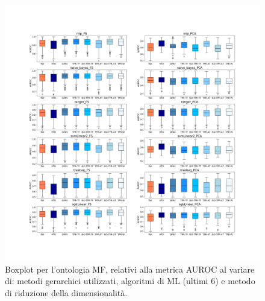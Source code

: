 \documentclass[12pt]{report}
\begin{document}
\begin{appendices}
\begin{figure}[h]
 \hspace*{-2.6cm}
\includegraphics[scale=0.34]{./images/MF_AUC_2.png}
\caption{\footnotesize{Boxplot per l'ontologia MF, relativi alla metrica AUROC al variare di: metodi gerarchici utilizzati, algoritmi di ML (ultimi 6) e metodo di riduzione della dimensionalità.}}
\label{MF_AUC_2}
\end{figure}


\end{appendices}
\end{document}
